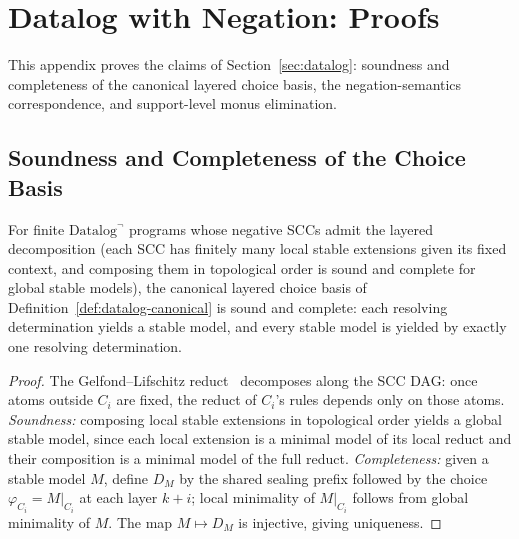\section{Datalog with Negation: Proofs}
\label{sec:appendix-datalog}

This appendix proves the claims of Section~\ref{sec:datalog}: soundness and
completeness of the canonical layered choice basis, the negation-semantics
correspondence, and support-level monus elimination.

\subsection{Soundness and Completeness of the Choice Basis}

\begin{proposition}
  \label{prop:datalog-sc}
  For finite $\mbox{Datalog}^\neg$ programs whose negative SCCs admit the
  layered decomposition (each SCC has finitely many local stable extensions
  given its fixed context, and composing them in topological order is sound
  and complete for global stable models), the canonical layered choice basis
  of Definition~\ref{def:datalog-canonical} is sound and complete: each
  resolving determination yields a stable model, and every stable model is
  yielded by exactly one resolving determination.
\end{proposition}
\begin{proof}
  The Gelfond--Lifschitz reduct~\cite{gelfond1988stable} decomposes along the
  SCC DAG: once atoms outside $C_i$ are fixed, the reduct of $C_i$'s rules
  depends only on those atoms. \emph{Soundness:} composing local stable
  extensions in topological order yields a global stable model, since each
  local extension is a minimal model of its local reduct and their composition
  is a minimal model of the full reduct. \emph{Completeness:} given a stable
  model $M$, define $D_M$ by the shared sealing prefix followed by the choice
  $\varphi_{C_i} = M|_{C_i}$ at each layer $k{+}i$; local minimality of
  $M|_{C_i}$ follows from global minimality of $M$. The map $M \mapsto D_M$ is
  injective, giving uniqueness.
\end{proof}

